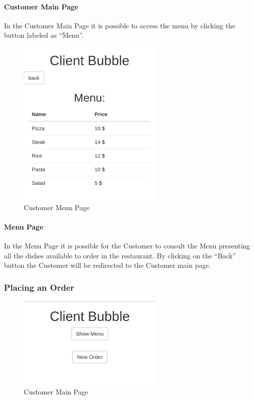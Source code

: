 \paragraph{Customer Main Page}
In the Customer Main Page it is possible to access the menu by clicking the button labeled as ``Menu''.
\begin{figure}[H]
	\centering
	\includegraphics[width=7cm]{../../documenti/UserManualDemo/demo_screens/client_menu.png}
	\caption{Customer Menu Page}
\end{figure}
\paragraph{Menu Page }
In the Menu Page it is possible for the Customer to consult the Menu presenting all the dishes available to order in the restaurant.
By clicking on the ``Back'' button the Customer will be redirected to the Customer main page.

\subsubsection{Placing an Order}
\begin{figure}[H]
	\centering
	\includegraphics[width=7cm]{../../documenti/UserManualDemo/demo_screens/client_main.png}
	\caption{Customer Main Page}
\end{figure}
